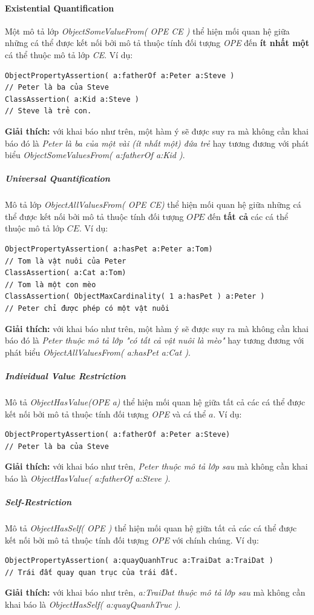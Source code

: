 \paragraph{Existential Quantification} Một mô tả lớp \textit{ObjectSomeValueFrom( OPE CE )} thể hiện mối quan hệ giữa những cá thể được kết nối bởi mô tả thuộc tính đối tượng \textit{OPE} đến \textbf{ít nhất một} cá thể thuộc mô tả lớp \textit{CE}. Ví dụ:
\begin{verbatim}
ObjectPropertyAssertion( a:fatherOf a:Peter a:Steve ) 
// Peter là ba của Steve                    
ClassAssertion( a:Kid a:Steve )         
// Steve là trẻ con.
\end{verbatim} 
\textbf{Giải thích:} với khai báo như trên, một hàm ý sẽ được suy ra mà không cần khai báo đó là \textit{Peter là ba của một vài (ít nhất một) đứa trẻ} hay tương đương với phát biểu \textit{ObjectSomeValuesFrom( a:fatherOf a:Kid )}.

\subparagraph{Universal Quantification} Mô tả lớp \textit{ObjectAllValuesFrom( OPE CE)} thể hiện mối quan hệ giữa những cá thể được kết nối bởi mô tả thuộc tính đối tượng $OPE$ đến \textbf{tất cả} các cá thể thuộc mô tả lớp $CE$. Ví dụ: 
\begin{verbatim}
ObjectPropertyAssertion( a:hasPet a:Peter a:Tom)
// Tom là vật nuôi của Peter
ClassAssertion( a:Cat a:Tom) 
// Tom là một con mèo
ClassAssertion( ObjectMaxCardinality( 1 a:hasPet ) a:Peter )
// Peter chỉ được phép có một vật nuôi
\end{verbatim}
\textbf{Giải thích:} với khai báo như trên, một hàm ý sẽ được suy ra mà không cần khai báo đó là \textit{Peter thuộc mô tả lớp "có tất cả vật nuôi là mèo"} hay tương đương với phát biểu \textit{ObjectAllValuesFrom( a:hasPet a:Cat )}.

\subparagraph{Individual Value Restriction} Mô tả  \textit{ObjectHasValue(OPE a)} thể hiện mối quan hệ giữa tất cả các cá thể được kết nối bởi mô tả thuộc tính đối tượng \textit{OPE} và cá thể $a$. Ví dụ:
\begin{verbatim}
ObjectPropertyAssertion( a:fatherOf a:Peter a:Steve)
// Peter là ba của Steve
\end{verbatim}
\textbf{Giải thích:} với khai báo như trên, \textit{Peter thuộc mô tả lớp sau} mà không cần khai báo là \textit{ObjectHasValue( a:fatherOf a:Steve )}.

\subparagraph{Self-Restriction} Mô tả \textit{ObjectHasSelf( OPE )} thể hiện mối quan hệ giữa tất cả các cá thể được kết nối bởi mô tả thuộc tính đối tượng \textit{OPE} với chính chúng. Ví dụ:
\begin{verbatim}
ObjectPropertyAssertion( a:quayQuanhTruc a:TraiDat a:TraiDat )	
// Trái đất quay quan trục của trái đất.
\end{verbatim}
\textbf{Giải thích:} với khai báo như trên, \textit{a:TraiDat thuộc mô tả lớp sau} mà không cần khai báo là \textit{ObjectHasSelf( a:quayQuanhTruc )}.

